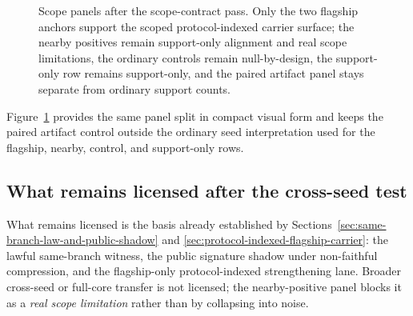 \documentclass[11pt]{article}
\theoremstyle{definition}
\begin{document}
\begin{figure}[t]
\centering
{}
\caption{Scope panels after the scope-contract pass. Only the two flagship anchors
support the scoped protocol-indexed carrier surface; the nearby positives remain
support-only alignment and real scope limitations, the ordinary controls remain
null-by-design, the support-only row remains support-only, and the paired artifact panel
stays separate from ordinary support counts.}
\label{fig:scope-panel}
\end{figure}

Figure~\ref{fig:scope-panel} provides the same panel split in compact visual form and
keeps the paired artifact control outside the ordinary seed interpretation used for the
flagship, nearby, control, and support-only rows.

\subsection{What remains licensed after the cross-seed test}

What remains licensed is the basis already established by
Sections~\ref{sec:same-branch-law-and-public-shadow} and
\ref{sec:protocol-indexed-flagship-carrier}: the lawful same-branch witness, the public
signature shadow under non-faithful compression, and the flagship-only protocol-indexed
strengthening lane. Broader cross-seed or full-core transfer is not licensed; the
nearby-positive panel blocks it as a \emph{real scope limitation} rather than by
collapsing into noise.
\end{document}
